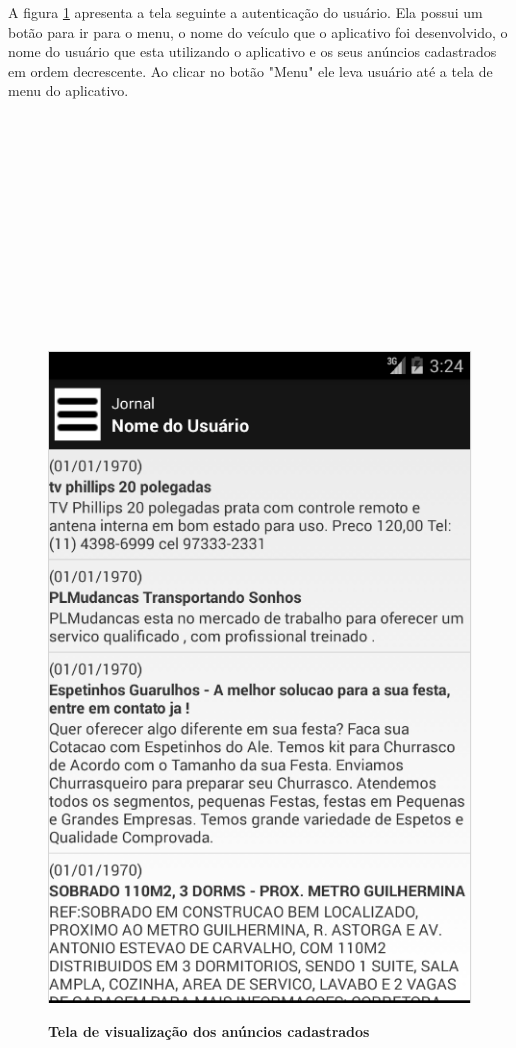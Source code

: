 \documentclass[
	12pt,				%
	openright,			%
	oneside,			%
	a4paper,			%
	chapter=TITLE,		%
	section=TITLE,		%
	english,			%
	french,				%
	spanish,			%
	brazil				%
	]{abntex2}
\begin{document}
A figura \ref{fig-android-meus-anuncios} apresenta a tela seguinte a autenticação do usuário. Ela possui um botão para ir para o menu, o nome do veículo que o aplicativo foi desenvolvido, o nome do usuário que esta utilizando o aplicativo e os seus anúncios cadastrados em ordem decrescente. Ao clicar no botão "Menu" ele leva usuário até a tela de menu do aplicativo. \\ \\ \\ \\ \\ \\ \\ \\ \\ \\ \\ \\ \\

\begin{figure}[h]
	\begin{center}
		\caption{
			\textbf{Tela de visualização dos anúncios cadastrados}
		}\label{fig-android-meus-anuncios}
		\includegraphics [scale=0.6]{imagens/android-meus-anuncios.png}
		\label{fig-android-meus-anuncios}
	\end{center}
\end{figure}
\end{document}
